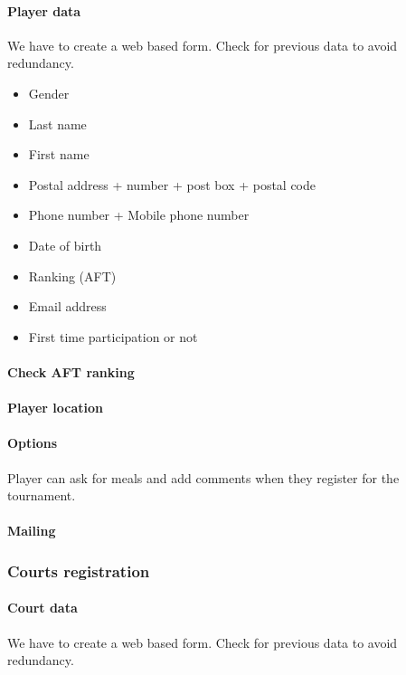 \paragraph{Player data}

We have to create a web based form. Check for previous data to avoid
redundancy. \newline

\begin{itemize}
    \item Gender
    \item Last name
    \item First name
    \item Postal address + number + post box + postal code
    \item Phone number + Mobile phone number
    \item Date of birth
    \item Ranking (AFT)
    \item Email address
    \item First time participation or not
\end{itemize}

\paragraph{Check AFT ranking}
\paragraph{Player location}
\paragraph{Options}

Player can ask for meals and add comments when they register for the
tournament.

\paragraph{Mailing}

\subsubsection{Courts registration}

\paragraph{Court data}

We have to create a web based form. Check for previous data to avoid
redundancy.

